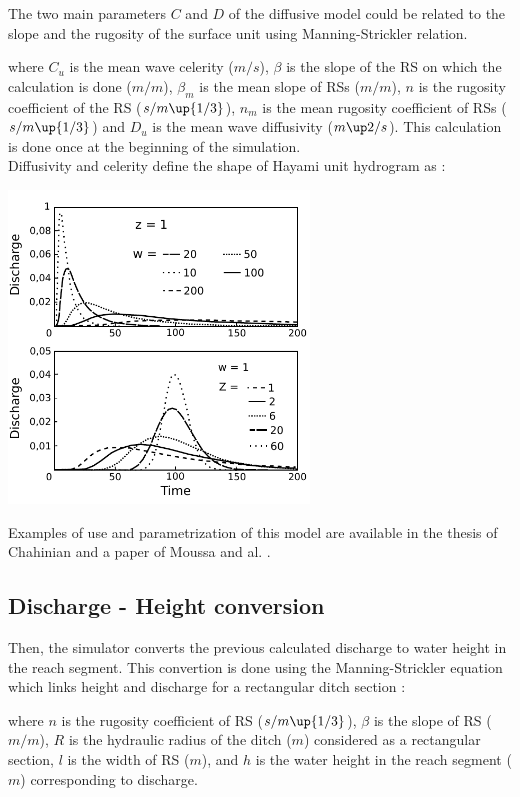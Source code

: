 The two main parameters $C$ and $D$ of the diffusive model could be related to the slope and the rugosity of the surface unit using Manning-Strickler relation.



where $C_u$ is the mean wave celerity ($m/s$), $\beta$ is the slope of the RS on which the calculation is done ($m/m$), $\beta_m$ is the mean slope of RSs ($m/m$), $n$ is the rugosity coefficient of the RS ($s/m\up{1/3}$), $n_m$ is the mean rugosity coefficient of RSs ($s/m\up{1/3}$) and $D_u$ is the mean wave diffusivity ($m\up2/s$). This calculation is done once at the beginning of the simulation.\\

Diffusivity and celerity define the shape of Hayami unit hydrogram as :


\includegraphics[width=8cm]{doc/common/Graphique_noyau_Hayami.pdf}

Examples of use and parametrization of this model are available in the thesis of Chahinian \cite{Chahinian2004} and a paper of Moussa and al. \cite{Moussa2002}.


\subsection{Discharge - Height conversion}
Then, the simulator converts the previous calculated discharge to water height in the reach segment. This convertion is done using the Manning-Strickler equation which links height and discharge for a rectangular ditch section :



where $n$ is the rugosity coefficient of RS ($s/m\up{1/3}$), $\beta$ is the slope of RS ($m/m$), $R$ is the hydraulic radius of the ditch ($m$) considered as a rectangular section, $l$ is the width of RS ($m$), and $h$ is the water height in the reach segment ($m$) corresponding to discharge.\\

